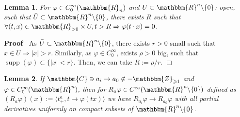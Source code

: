 \documentclass{article}
\newcommand{\assign}{:=}
\newcommand{\nin}{\not\in}
\newcommand{\tmop}[1]{\ensuremath{\operatorname{#1}}}
\newenvironment{proof}{\noindent\textbf{Proof\ }}{\hspace*{\fill}$\Box$\medskip}
\numberwithin{definition}{section}
\newtheorem{lemma}{Lemma}
\numberwithin{lemma}{section}
\numberwithin{proposition}{section}
{\theorembodyfont{\rmfamily}\newtheorem{remark}{Remark}
\numberwithin{remark}{section}
}
\begin{document}
\begin{lemma}
  \label{holomorphicity-preserving:lem-phi-satisfies}For $\varphi \in
  C^{\infty}_0 ( \mathbbm{R}_n)$ and $U \subset \mathbbm{R}^n \backslash \{ 0
  \}$: open, such that $\bar{U} \subset \mathbbm{R}^n \backslash \{ 0 \}$,
  there exists $R$ such that $\forall ( t, x) \in \mathbbm{R}_{> 0} \times U,
  t > R \Rightarrow \varphi ( t \cdot x) = 0$.
\end{lemma}

\begin{proof}
  As $\bar{U} \subset \mathbbm{R}^n \backslash \{ 0 \}$, there exists $r > 0$
  small such that $x \in U \Rightarrow | x | > r$. Similarly, as $\varphi \in
  C^{\infty}_0$, exists $\rho > 0$ big, such that $\tmop{supp} ( \varphi)
  \subset \{ | x | < r \}$. Then, we can take $R \assign \rho / r$.
\end{proof}

\begin{lemma}
  \label{holomorphicity-preserving:lem-t+-cts}If $\mathbbm{C} \ni a_i
  \rightarrow a_0 \nin -\mathbbm{Z}_{\geqslant 1}$ and $\varphi \in
  C_0^{\infty} ( \mathbbm{R}^n)$, then for $R_a \varphi \in C^{\infty} (
  \mathbbm{R}^n \backslash \{ 0 \})$ defined as $( R_a \varphi) ( x) \assign
  \langle t_+^a, t \mapsto \varphi ( t x) \rangle$ we have $R_{a_i} \varphi
  \rightarrow R_{a_0} \varphi$ with all partial derivatives uniformly on
  compact subsets of $\mathbbm{R}^n \backslash \{ 0 \}$.
\end{lemma}
\end{document}
